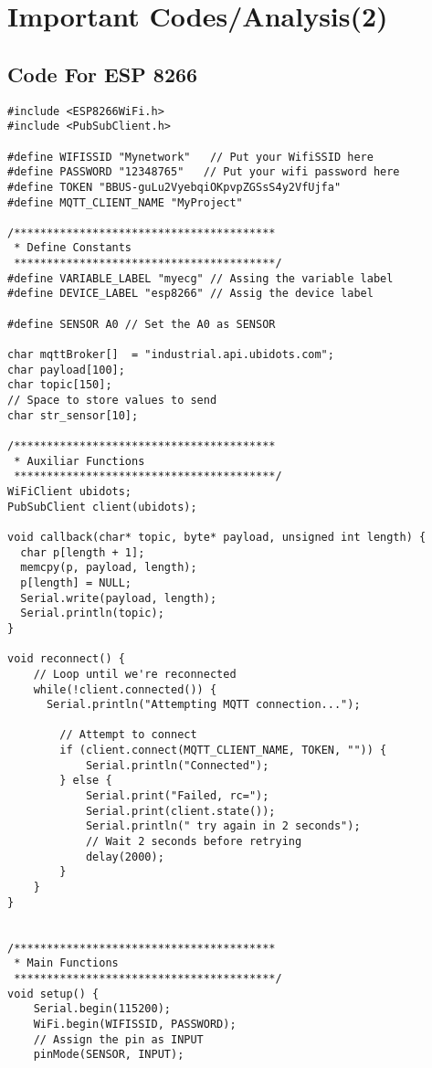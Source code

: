 \chapter{Important Codes/Analysis(2)}
\section{Code For ESP 8266}
\lstset{language=Python}
\lstset{frame=lines}
\lstset{basicstyle=\footnotesize}
\begin{lstlisting}
#include <ESP8266WiFi.h>
#include <PubSubClient.h>
 
#define WIFISSID "Mynetwork"   // Put your WifiSSID here
#define PASSWORD "12348765"   // Put your wifi password here
#define TOKEN "BBUS-guLu2VyebqiOKpvpZGSsS4y2VfUjfa"         
#define MQTT_CLIENT_NAME "MyProject"                       
 
/****************************************
 * Define Constants
 ****************************************/
#define VARIABLE_LABEL "myecg" // Assing the variable label
#define DEVICE_LABEL "esp8266" // Assig the device label
 
#define SENSOR A0 // Set the A0 as SENSOR
 
char mqttBroker[]  = "industrial.api.ubidots.com";
char payload[100];
char topic[150];
// Space to store values to send
char str_sensor[10];
 
/****************************************
 * Auxiliar Functions
 ****************************************/
WiFiClient ubidots;
PubSubClient client(ubidots);
 
void callback(char* topic, byte* payload, unsigned int length) {
  char p[length + 1];
  memcpy(p, payload, length);
  p[length] = NULL;
  Serial.write(payload, length);
  Serial.println(topic);
}
 
void reconnect() {
    // Loop until we're reconnected
    while(!client.connected()) {
      Serial.println("Attempting MQTT connection...");
        
        // Attempt to connect
        if (client.connect(MQTT_CLIENT_NAME, TOKEN, "")) {
            Serial.println("Connected");
        } else {
            Serial.print("Failed, rc=");
            Serial.print(client.state());
            Serial.println(" try again in 2 seconds");
            // Wait 2 seconds before retrying
            delay(2000);
        }
    }
}


/****************************************
 * Main Functions
 ****************************************/
void setup() {
    Serial.begin(115200);
    WiFi.begin(WIFISSID, PASSWORD);
    // Assign the pin as INPUT 
    pinMode(SENSOR, INPUT);
    

\end{lstlisting}
